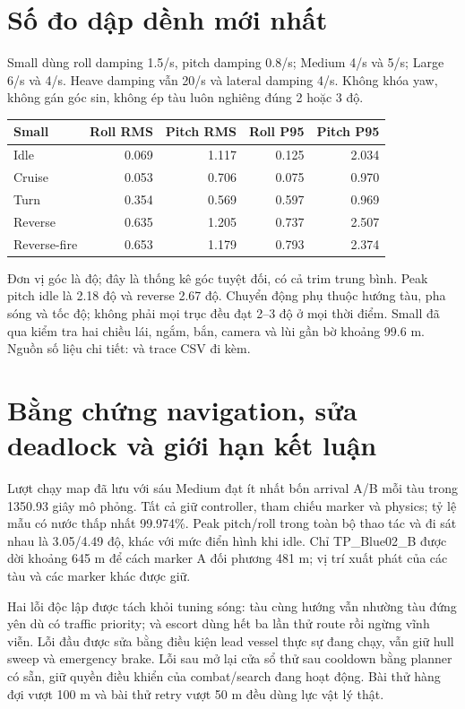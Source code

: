\section{Số đo dập dềnh mới nhất}
Small dùng roll damping 1.5/s, pitch damping 0.8/s; Medium 4/s và 5/s; Large 6/s và 4/s. Heave damping vẫn 20/s và lateral damping 4/s. Không khóa yaw, không gán góc sin, không ép tàu luôn nghiêng đúng 2 hoặc 3 độ.
\begin{center}
\begin{tabular}{lrrrr}
\toprule Small & Roll RMS & Pitch RMS & Roll P95 & Pitch P95 \\
\midrule
Idle & 0.069 & 1.117 & 0.125 & 2.034 \\
Cruise & 0.053 & 0.706 & 0.075 & 0.970 \\
Turn & 0.354 & 0.569 & 0.597 & 0.969 \\
Reverse & 0.635 & 1.205 & 0.737 & 2.507 \\
Reverse-fire & 0.653 & 1.179 & 0.793 & 2.374 \\
\bottomrule
\end{tabular}
\end{center}
Đơn vị góc là độ; đây là thống kê góc tuyệt đối, có cả trim trung bình. Peak pitch idle là 2.18 độ và reverse 2.67 độ. Chuyển động phụ thuộc hướng tàu, pha sóng và tốc độ; không phải mọi trục đều đạt 2--3 độ ở mọi thời điểm. Small đã qua kiểm tra hai chiều lái, ngắm, bắn, camera và lùi gần bờ khoảng 99.6 m. Nguồn số liệu chi tiết:  và trace CSV đi kèm.

\section{Bằng chứng navigation, sửa deadlock và giới hạn kết luận}
Lượt chạy map đã lưu với sáu Medium đạt ít nhất bốn arrival A/B mỗi tàu trong 1350.93 giây mô phỏng. Tất cả giữ controller, tham chiếu marker và physics; tỷ lệ mẫu có nước thấp nhất 99.974\%. Peak pitch/roll trong toàn bộ thao tác và đi sát nhau là 3.05/4.49 độ, khác với mức điển hình khi idle. Chỉ TP\_Blue02\_B được dời khoảng 645 m để cách marker A đối phương 481 m; vị trí xuất phát của các tàu và các marker khác được giữ.

Hai lỗi độc lập được tách khỏi tuning sóng: tàu cùng hướng vẫn nhường tàu đứng yên dù có traffic priority; và escort dùng hết ba lần thử route rồi ngừng vĩnh viễn. Lỗi đầu được sửa bằng điều kiện lead vessel thực sự đang chạy, vẫn giữ hull sweep và emergency brake. Lỗi sau mở lại cửa sổ thử sau cooldown bằng planner có sẵn, giữ quyền điều khiển của combat/search đang hoạt động. Bài thử hàng đợi vượt 100 m và bài thử retry vượt 50 m đều dùng lực vật lý thật.

